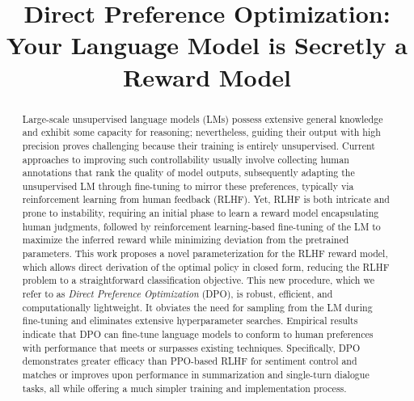 \title{Direct Preference Optimization: Your Language Model is Secretly a Reward Model}

\begin{abstract}
Large-scale unsupervised language models (LMs) possess extensive general knowledge and exhibit some capacity for reasoning; nevertheless, guiding their output with high precision proves challenging because their training is entirely unsupervised. Current approaches to improving such controllability usually involve collecting human annotations that rank the quality of model outputs, subsequently adapting the unsupervised LM through fine-tuning to mirror these preferences, typically via reinforcement learning from human feedback (RLHF). Yet, RLHF is both intricate and prone to instability, requiring an initial phase to learn a reward model encapsulating human judgments, followed by reinforcement learning-based fine-tuning of the LM to maximize the inferred reward while minimizing deviation from the pretrained parameters. This work proposes a novel parameterization for the RLHF reward model, which allows direct derivation of the optimal policy in closed form, reducing the RLHF problem to a straightforward classification objective. This new procedure, which we refer to as \textit{Direct Preference Optimization} (DPO), is robust, efficient, and computationally lightweight. It obviates the need for sampling from the LM during fine-tuning and eliminates extensive hyperparameter searches. Empirical results indicate that DPO can fine-tune language models to conform to human preferences with performance that meets or surpasses existing techniques. Specifically, DPO demonstrates greater efficacy than PPO-based RLHF for sentiment control and matches or improves upon performance in summarization and single-turn dialogue tasks, all while offering a much simpler training and implementation process.
\end{abstract}

